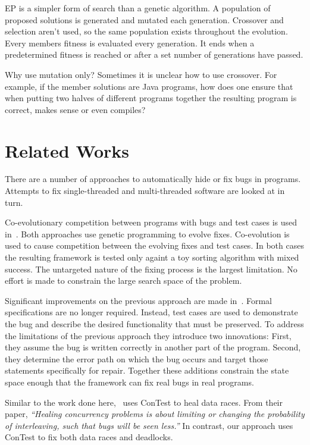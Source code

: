 \documentclass[10pt, conference, compsocconf]{IEEEtran}
\begin{document}
EP is a simpler form of search than a genetic algorithm. A population of
proposed solutions is generated and mutated each generation.  Crossover and
selection aren't used, so the same population exists throughout the evolution.
Every members fitness is evaluated every generation. It ends when a
predetermined fitness is reached or after a set number of generations have
passed.

Why use mutation only?  Sometimes it is unclear how to use crossover.  For
example, if the member solutions are Java programs, how does one ensure that
when putting two halves of different programs together the resulting program is
correct, makes sense or even compiles?

\section{Related Works}
\label{sec:related_works}

There are a number of approaches to automatically hide or fix bugs in programs.
Attempts to fix single-threaded and multi-threaded software are looked at
in turn.

Co-evolutionary competition between programs with bugs and test cases is used
in~\cite{AY08, Arc08, WT10}. Both approaches use genetic programming to evolve
fixes. Co-evolution is used to cause competition between the evolving fixes and
test cases. In both cases the resulting framework is tested only againt a toy
sorting algorithm with mixed success. The untargeted nature of the fixing
process is the largest limitation. No effort is made to constrain the large
search space of the problem.

Significant improvements on the previous approach are made in~\cite{FNWG09,
WNLF09, NWLF09, WFGN10, GNFW11}. Formal specifications are no longer required.
Instead, test cases are used to demonstrate the bug and describe the desired
functionality that must be preserved. To address the limitations of the
previous approach they introduce two innovations: First, they assume the bug is
written correctly in  another part of the program. Second, they determine the
error path on which the bug occurs and target those statements specifically for
repair.  Together these additions constrain the state space enough that the
framework can fix real bugs in real programs.

Similar to the work done here,~\cite{KLT+07, LVK08} uses ConTest to heal data
races. From their paper, \textit{``Healing concurrency problems is about
limiting or changing the probability of interleaving, such that bugs will be
seen less.''} In contrast, our approach uses ConTest to fix both data races and
deadlocks.
\end{document}
